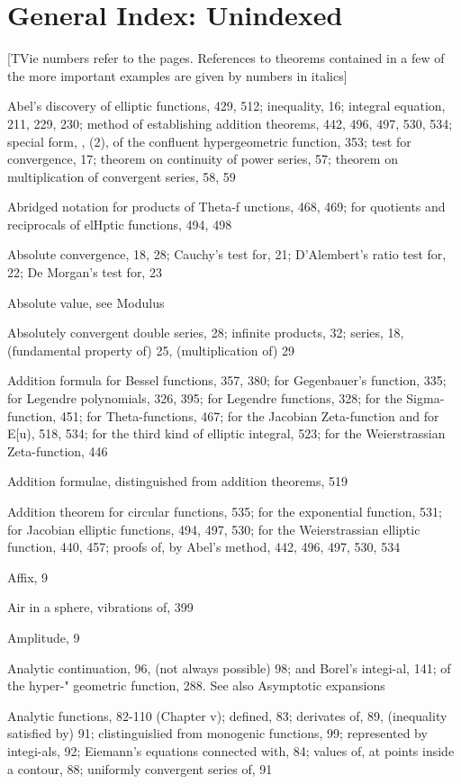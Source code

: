 \chapter{General Index: Unindexed}

[TVie numbers refer to the pages. References to theorems contained in a few of
the more important examples are given by numbers in italics]

Abel's discovery of elliptic functions, 429, 512; inequality, 16; integral equation, 211, 229, 230;
method of establishing addition theorems, 442, 496, 497, 530, 534; special form,  , (2), of
the confluent hypergeometric function, 353; test for convergence, 17; theorem on continuity
of power series, 57; theorem on multiplication of convergent series, 58, 59

Abridged notation for products of Theta-f unctions, 468, 469; for quotients and reciprocals of
elHptic functions, 494, 498

Absolute convergence, 18, 28; Cauchy's test for, 21; D'Alembert's ratio test for, 22; De
 Morgan's test for, 23

Absolute value, see Modulus

Absolutely convergent double series, 28; infinite products, 32; series, 18, (fundamental
property of) 25, (multiplication of) 29

Addition formula for Bessel functions, 357, 380; for Gegenbauer's function, 335; for Legendre
polynomials, 326, 395; for Legendre functions, 328; for the Sigma-function, 451; for
Theta-functions, 467; for the Jacobian Zeta-function and for E[u), 518, 534; for the
third kind of elliptic integral, 523; for the Weierstrassian Zeta-function, 446

Addition formulae, distinguished from addition theorems, 519

Addition theorem for circular functions, 535; for the exponential function, 531; for Jacobian
elliptic functions, 494, 497, 530; for the Weierstrassian elliptic function, 440, 457; proofs
of, by Abel's method, 442, 496, 497, 530, 534

Affix, 9

Air in a sphere, vibrations of, 399

Amplitude, 9

Analytic continuation, 96, (not always possible) 98; and Borel's integi-al, 141; of the hyper-"
geometric function, 288. See also Asymptotic expansions

Analytic functions, 82-110 (Chapter v); defined, 83; derivates of, 89, (inequality satisfied by) 91;
clistinguislied from monogenic functions, 99; represented by integi-als, 92; Eiemann's
equations connected with, 84; values of, at points inside a contour, 88; uniformly convergent
series of, 91

